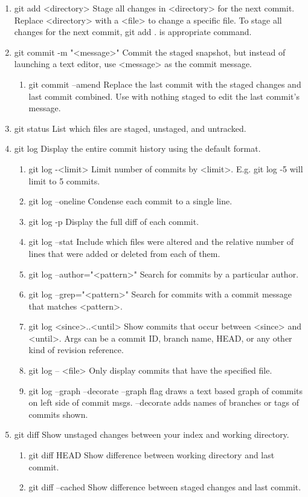 \documentclass[11pt]{article}
\begin{document}
\begin{enumerate}
\begin{enumerate}
\end{enumerate}
\item git add <directory>
\label{sec-1-1-1-4}
Stage all changes in <directory> for the next commit.
Replace <directory> with a <file> to change a specific file. To stage all changes for the next commit, git add . is appropriate command.
\item git commit -m "<message>"
\label{sec-1-1-1-5}
Commit the staged snapshot, but instead of launching a text editor,
use <message> as the commit message.
\begin{enumerate}
\item git commit --amend
\label{sec-1-1-1-5-1}
Replace the last commit with the staged changes and last commit
combined. Use with nothing staged to edit the last commit’s message.
\end{enumerate}
\item git status
\label{sec-1-1-1-6}
List which files are staged, unstaged, and untracked.
\item git log
\label{sec-1-1-1-7}
Display the entire commit history using the default format.
\begin{enumerate}
\item git log -<limit>
\label{sec-1-1-1-7-1}
Limit number of commits by <limit>. E.g. git log -5 will limit to 5
commits.
\item git log --oneline
\label{sec-1-1-1-7-2}
Condense each commit to a single line.
\item git log -p
\label{sec-1-1-1-7-3}
Display the full diff of each commit.
\item git log --stat
\label{sec-1-1-1-7-4}
Include which files were altered and the relative number of lines
that were added or deleted from each of them.
\item git log --author="<pattern>"
\label{sec-1-1-1-7-5}
Search for commits by a particular author.
\item git log --grep="<pattern>"
\label{sec-1-1-1-7-6}
Search for commits with a commit message that matches <pattern>.
\item git log <since>..<until>
\label{sec-1-1-1-7-7}
Show commits that occur between <since> and <until>. Args can be a
commit ID, branch name, HEAD, or any other kind of revision reference.
\item git log -- <file>
\label{sec-1-1-1-7-8}
Only display commits that have the specified file.
\item git log --graph --decorate
\label{sec-1-1-1-7-9}
--graph flag draws a text based graph of commits on left side of commit
msgs. --decorate adds names of branches or tags of commits shown.
\end{enumerate}
\item git diff
\label{sec-1-1-1-8}
Show unstaged changes between your index and working directory.
\begin{enumerate}
\item git diff HEAD
\label{sec-1-1-1-8-1}
Show difference between working directory and last commit.
\item git diff --cached
\label{sec-1-1-1-8-2}
Show difference between staged changes and last commit.
\end{enumerate}
\end{enumerate}
\end{document}
